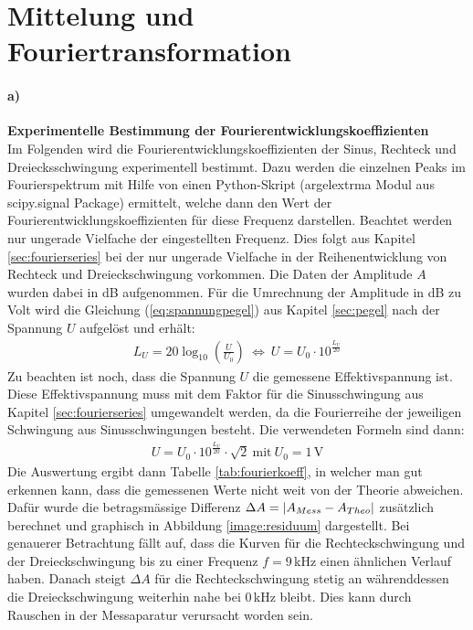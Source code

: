 
\section{Mittelung und Fouriertransformation}
\label{sec:mittelungAndTrafo}

\paragraph{a)}\textbf{Experimentelle Bestimmung der Fourierentwicklungskoeffizienten}\\
Im Folgenden wird die Fourierentwicklungskoeffizienten der Sinus, Rechteck und Dreiecksschwingung experimentell bestimmt. Dazu werden die einzelnen Peaks im Fourierspektrum mit Hilfe von einen Python-Skript (argelextrma Modul aus scipy.signal Package) ermittelt, welche dann den Wert der Fourierentwicklungskoeffizienten für diese Frequenz darstellen. Beachtet werden nur ungerade Vielfache der eingestellten Frequenz. Dies folgt aus Kapitel \ref{sec:fourierseries} bei der nur ungerade Vielfache in der Reihenentwicklung von Rechteck und Dreieckschwingung vorkommen. Die Daten der Amplitude $A$ wurden dabei in dB aufgenommen. Für die Umrechnung der Amplitude in dB zu Volt wird die Gleichung (\ref{eq:spannungpegel}) aus Kapitel \ref{sec:pegel} nach der Spannung $U$ aufgelöst und erhält:
\begin{gather}
    L_U = 20 \log_{10}\left(\frac{U}{U_0}\right)~\Leftrightarrow~U = U_0 \cdot 10^{\frac{L_U}{20}}
\end{gather}
Zu beachten ist noch, dass die Spannung $U$ die gemessene Effektivspannung ist. Diese Effektivspannung muss mit dem Faktor für die Sinusschwingung aus Kapitel \ref{sec:fourierseries} umgewandelt werden, da die Fourierreihe der jeweiligen Schwingung aus Sinusschwingungen besteht. Die verwendeten Formeln sind dann:
\begin{gather}
    U = U_0 \cdot 10^{\frac{L_U}{20}} \cdot \sqrt{2}  ~\text{mit}~U_0=1\,\text{V}
    \label{eq:umrechnung}
\end{gather}
Die Auswertung ergibt dann Tabelle \ref{tab:fourierkoeff}, in welcher man gut erkennen kann, dass die gemessenen Werte nicht weit von der Theorie abweichen. Dafür wurde die betragsmässige Differenz $\Delta A = \abs{A_{Mess}-A_{Theo}}$ zusätzlich berechnet und graphisch in Abbildung \ref{image:residuum} dargestellt. Bei genauerer Betrachtung fällt auf, dass die Kurven für die Rechteckschwingung und der Dreieckschwingung bis zu einer Frequenz $f=9$\,kHz einen ähnlichen Verlauf haben. Danach steigt $\Delta A$ für die Rechteckschwingung stetig an währenddessen die Dreieckschwingung weiterhin nahe bei 0\,kHz bleibt. Dies kann durch Rauschen in der Messaparatur verursacht worden sein.
